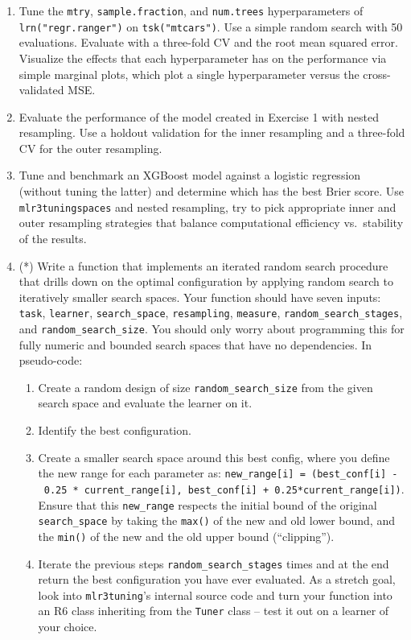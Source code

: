 \begin{enumerate}
\def\labelenumi{\arabic{enumi}.}
\tightlist
\item
  Tune the \texttt{mtry}, \texttt{sample.fraction}, and
  \texttt{num.trees} hyperparameters of \texttt{lrn("regr.ranger")} on
  \texttt{tsk("mtcars")}. Use a simple random search with 50
  evaluations. Evaluate with a three-fold CV and the root mean squared
  error. Visualize the effects that each hyperparameter has on the
  performance via simple marginal plots, which plot a single
  hyperparameter versus the cross-validated MSE.
\item
  Evaluate the performance of the model created in Exercise 1 with
  nested resampling. Use a holdout validation for the inner resampling
  and a three-fold CV for the outer resampling.
\item
  Tune and benchmark an XGBoost model against a logistic regression
  (without tuning the latter) and determine which has the best Brier
  score. Use \texttt{mlr3tuningspaces} and nested resampling, try to
  pick appropriate inner and outer resampling strategies that balance
  computational efficiency vs.~stability of the results.
\item
  (*) Write a function that implements an iterated random search
  procedure that drills down on the optimal configuration by applying
  random search to iteratively smaller search spaces. Your function
  should have seven inputs: \texttt{task}, \texttt{learner},
  \texttt{search\_space}, \texttt{resampling}, \texttt{measure},
  \texttt{random\_search\_stages}, and \texttt{random\_search\_size}.
  You should only worry about programming this for fully numeric and
  bounded search spaces that have no dependencies. In pseudo-code:

  \begin{enumerate}
  \def\labelenumii{(\arabic{enumii})}
  \tightlist
  \item
    Create a random design of size \texttt{random\_search\_size} from
    the given search space and evaluate the learner on it.
  \item
    Identify the best configuration.
  \item
    Create a smaller search space around this best config, where you
    define the new range for each parameter as:
    \texttt{new\_range{[}i{]}\ =\ (best\_conf{[}i{]}\ -\ 0.25\ *\ current\_range{[}i{]},\ best\_conf{[}i{]}\ +\ 0.25*current\_range{[}i{]})}.
    Ensure that this \texttt{new\_range} respects the initial bound of
    the original \texttt{search\_space} by taking the \texttt{max()} of
    the new and old lower bound, and the \texttt{min()} of the new and
    the old upper bound (``clipping'').
  \item
    Iterate the previous steps \texttt{random\_search\_stages} times and
    at the end return the best configuration you have ever evaluated. As
    a stretch goal, look into \texttt{mlr3tuning}'s internal source code
    and turn your function into an R6 class inheriting from the
    \texttt{Tuner} class -- test it out on a learner of your choice.
  \end{enumerate}
\end{enumerate}
